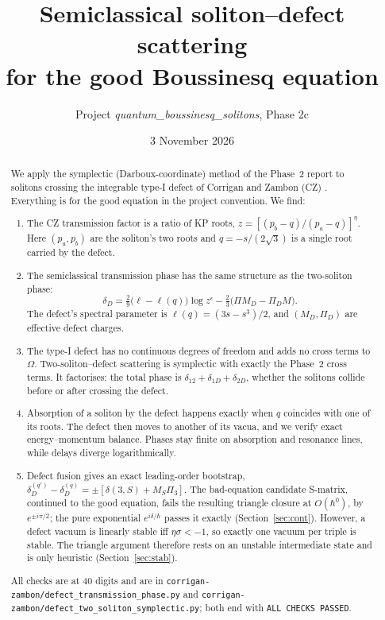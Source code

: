 \documentclass[11pt,a4paper]{article}
\title{Semiclassical soliton--defect scattering\\ for the good Boussinesq equation}
\author{Project \emph{quantum\_boussinesq\_solitons}, Phase 2c}
\date{3 November 2026}
\newcommand{\script}[1]{\texttt{corrigan-zambon/#1}}
\begin{document}
\maketitle
\begin{abstract}
We apply the symplectic (Darboux-coordinate) method of the Phase~2 report to solitons crossing the integrable type-I defect of Corrigan and Zambon (CZ) \cite{CZ}. Everything is for the good equation in the project convention. We find:
\begin{enumerate}
\item The CZ transmission factor is a ratio of KP roots, $z=[(p_b-q)/(p_a-q)]^{\eta}$. Here $(p_a,p_b)$ are the soliton's two roots and $q=-s/(2\sqrt3)$ is a single root carried by the defect.
\item The semiclassical transmission phase has the same structure as the two-soliton phase:
\[
\delta_D=\tfrac29\big(\ell-\ell(q)\big)\log z^{\epsilon}-\tfrac23\big(\Pi M_D-\Pi_D M\big).
\]
The defect's spectral parameter is $\ell(q)=(3s-s^3)/2$, and $(M_D,\Pi_D)$ are effective defect charges.
\item The type-I defect has no continuous degrees of freedom and adds no cross terms to $\Omega$. Two-soliton--defect scattering is symplectic with exactly the Phase~2 cross terms. It factorises: the total phase is $\delta_{12}+\delta_{1D}+\delta_{2D}$, whether the solitons collide before or after crossing the defect.
\item Absorption of a soliton by the defect happens exactly when $q$ coincides with one of its roots. The defect then moves to another of its vacua, and we verify exact energy--momentum balance. Phases stay finite on absorption and resonance lines, while delays diverge logarithmically.
\item Defect fusion gives an exact leading-order bootstrap, $\delta_D^{(q')}-\delta_D^{(q)}=\pm[\delta(3,S)+M_S\Pi_3]$. The bad-equation candidate S-matrix, continued to the good equation, fails the resulting triangle closure at $O(\hbar^0)$, by $e^{\pm i\pi/2}$; the pure exponential $e^{i\delta/\hbar}$ passes it exactly (Section~\ref{sec:cont}). However, a defect vacuum is linearly stable iff $\eta\sigma<-1$, so exactly one vacuum per triple is stable. The triangle argument therefore rests on an unstable intermediate state and is only heuristic (Section~\ref{sec:stab}).
\end{enumerate}
All checks are at 40 digits and are in \script{defect\_transmission\_phase.py} and \script{defect\_two\_soliton\_symplectic.py}; both end with \texttt{ALL CHECKS PASSED}.
\end{abstract}
\end{document}
